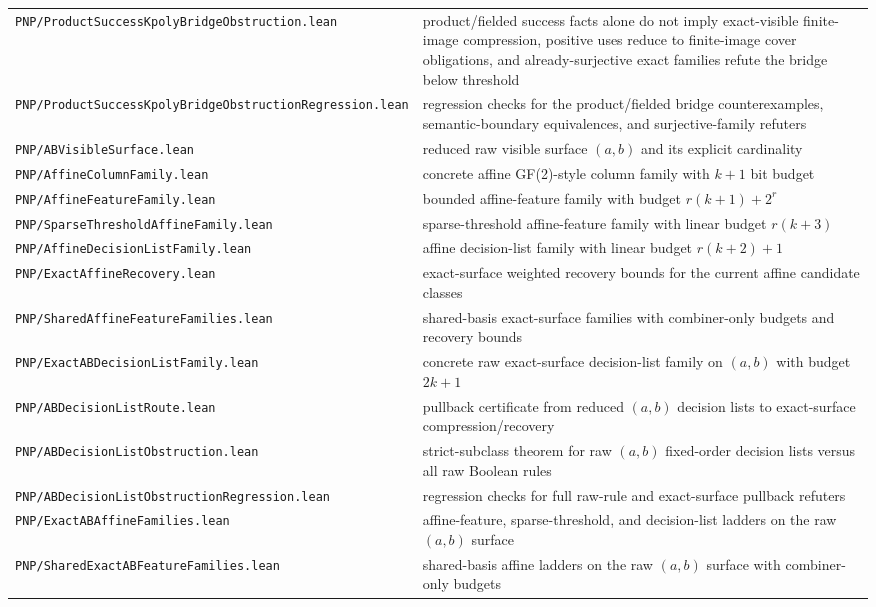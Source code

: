 \documentclass[11pt]{article}
\theoremstyle{remark}
\begin{document}
\begin{center}
\begin{tabular}{ll}
\texttt{PNP/ProductSuccessKpolyBridgeObstruction.lean} & product/fielded success facts alone do not imply exact-visible finite-image compression, positive uses reduce to finite-image cover obligations, and already-surjective exact families refute the bridge below threshold \\
\texttt{PNP/ProductSuccessKpolyBridgeObstructionRegression.lean} & regression checks for the product/fielded bridge counterexamples, semantic-boundary equivalences, and surjective-family refuters \\
\texttt{PNP/ABVisibleSurface.lean} & reduced raw visible surface $(a,b)$ and its explicit cardinality \\
\texttt{PNP/AffineColumnFamily.lean} & concrete affine GF(2)-style column family with $k+1$ bit budget \\
\texttt{PNP/AffineFeatureFamily.lean} & bounded affine-feature family with budget $r(k+1)+2^r$ \\
\texttt{PNP/SparseThresholdAffineFamily.lean} & sparse-threshold affine-feature family with linear budget $r(k+3)$ \\
\texttt{PNP/AffineDecisionListFamily.lean} & affine decision-list family with linear budget $r(k+2)+1$ \\
\texttt{PNP/ExactAffineRecovery.lean} & exact-surface weighted recovery bounds for the current affine candidate classes \\
\texttt{PNP/SharedAffineFeatureFamilies.lean} & shared-basis exact-surface families with combiner-only budgets and recovery bounds \\
\texttt{PNP/ExactABDecisionListFamily.lean} & concrete raw exact-surface decision-list family on $(a,b)$ with budget $2k+1$ \\
\texttt{PNP/ABDecisionListRoute.lean} & pullback certificate from reduced $(a,b)$ decision lists to exact-surface compression/recovery \\
\texttt{PNP/ABDecisionListObstruction.lean} & strict-subclass theorem for raw $(a,b)$ fixed-order decision lists versus all raw Boolean rules \\
\texttt{PNP/ABDecisionListObstructionRegression.lean} & regression checks for full raw-rule and exact-surface pullback refuters \\
\texttt{PNP/ExactABAffineFamilies.lean} & affine-feature, sparse-threshold, and decision-list ladders on the raw $(a,b)$ surface \\
\texttt{PNP/SharedExactABFeatureFamilies.lean} & shared-basis affine ladders on the raw $(a,b)$ surface with combiner-only budgets \\

\end{tabular}
\end{center}
\end{document}
